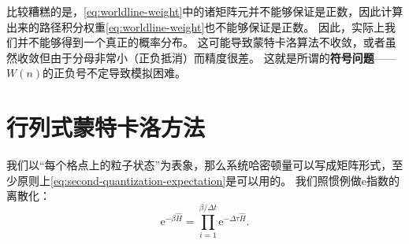\documentclass[hyperref, UTF8, a4paper]{ctexart}
\newcommand*{\ee}{\mathrm{e}}
\begin{document}
比较糟糕的是，\eqref{eq:worldline-weight}中的诸矩阵元并不能够保证是正数，因此计算出来的路径积分权重\eqref{eq:worldline-weight}也不能够保证是正数。
因此，实际上我们并不能够得到一个真正的概率分布。
这可能导致蒙特卡洛算法不收敛，或者虽然收敛但由于分母非常小（正负抵消）而精度很差。
这就是所谓的\textbf{符号问题}——$W(n)$的正负号不定导致模拟困难。

\section{行列式蒙特卡洛方法}

我们以“每个格点上的粒子状态”为表象，那么系统哈密顿量可以写成矩阵形式，至少原则上\eqref{eq:second-quantization-expectation}是可以用的。
我们照惯例做$\ee$指数的离散化：
\[
    \ee^{-\beta \hat{H}} = \prod_{i=1}^{\beta / \Delta t} \ee^{-\Delta \tau \hat{H}}.
\]
\end{document}
